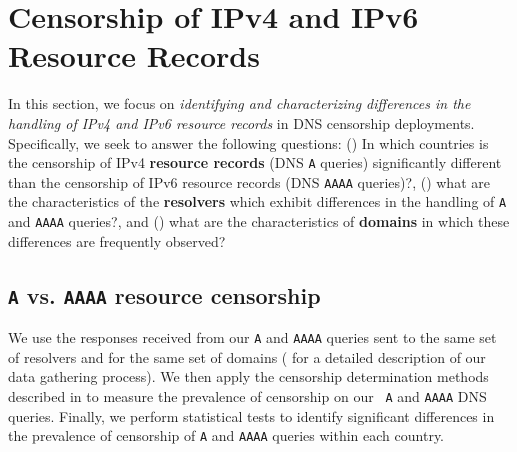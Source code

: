 \section{Censorship of IPv4 and IPv6 Resource Records} \label{sec:resources}

In this section, we focus on {\it identifying and characterizing differences in
the handling of IPv4 and IPv6 resource records} in DNS censorship deployments.
Specifically, we seek to answer the following questions: 
%
() In which countries is the censorship of IPv4
\textbf{resource records} (DNS {\tt A} queries) significantly different than the
censorship of IPv6 resource records (DNS {\tt AAAA} queries)?,
%
() what are the characteristics of the \textbf{resolvers}
which exhibit differences in the handling of {\tt A} and {\tt AAAA} queries?,
and 
%
() what are the characteristics of \textbf{domains} in which
these differences are frequently observed?
%

\subsection{{\tt A} vs. {\tt AAAA} resource censorship} \label{sec:resources:country}
%
We use the responses received from our {\tt A} and {\tt AAAA} queries sent to
the same set of resolvers and for the same set of domains (\cf
{} for a detailed description of our data gathering
process). We then apply the censorship determination methods described in
 to measure the prevalence of censorship on our {\tt
A} and {\tt AAAA} DNS queries. Finally, we perform statistical tests to
identify significant differences in the prevalence of censorship of {\tt A} and
{\tt AAAA} queries within each country.


